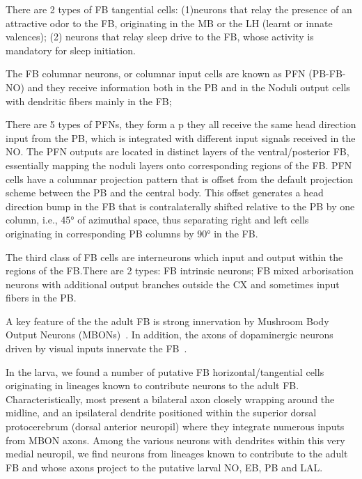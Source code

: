 \documentclass{article}
\begin{document}
There are 2 types of FB tangential cells: (1)neurons that relay the presence of an attractive odor to the FB, originating in the MB or the LH (learnt or innate valences); (2) neurons that relay sleep drive to the FB, whose activity is mandatory for sleep initiation. 

The FB columnar neurons, or columnar input cells are known as PFN (PB-FB-NO) and they receive information both in the PB and in the Noduli output cells with dendritic fibers mainly in the FB; 


There are 5 types of PFNs, they form a p they all receive the same head direction input from the PB, which is integrated with different input signals received in the NO. The PFN outputs are located in distinct layers of the ventral/posterior FB, essentially mapping the noduli layers onto corresponding regions of the FB. PFN cells have a columnar projection pattern that is offset from the default projection scheme between the PB and the central body. This offset generates a head direction bump in the FB that is contralaterally shifted relative to the PB by one column, i.e., 45° of azimuthal space, thus separating right and left cells originating in corresponding PB columns by 90° in the FB.

The third class of FB cells are interneurons which input and output within the regions of the FB.There are 2 types: FB intrinsic neurons; FB mixed arborisation neurons with additional output branches outside the CX and sometimes input fibers in the PB.


A key feature of the the adult FB is strong innervation by Mushroom Body Output Neurons (MBONs)~\citep{MISSING}. %
In addition, the axons of dopaminergic neurons driven by visual inputs innervate the FB~\citep{lin2013comprehensive}.




In the larva, we found a number of putative FB horizontal/tangential cells
originating in lineages known to contribute neurons to the adult FB. Characteristically, most present a bilateral axon closely wrapping around the midline, and an ipsilateral dendrite positioned within the superior dorsal protocerebrum (dorsal anterior neuropil) where they integrate numerous inputs from MBON axons. Among the various neurons with dendrites within this very medial neuropil, we find neurons from lineages known to contribute to the adult FB and whose axons project to the putative larval NO, EB, PB and LAL.
\end{document}

